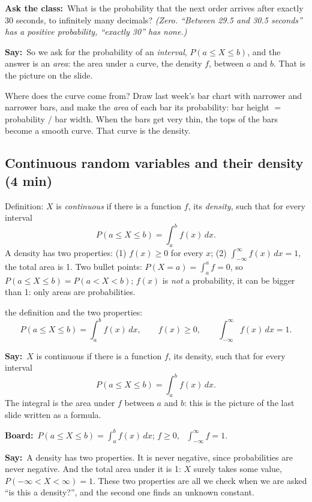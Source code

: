 \documentclass[11pt,a4paper,parskip=half]{scrartcl}
\renewcommand{\needspace}[1]{\Needspace{6\baselineskip}}
\newcommand{\say}{\textbf{\color{teal}Say:}\ }
\newcommand{\board}{\textbf{\color{gold}Board:}\ }
\newcommand{\ask}{\textbf{\color{navy}Ask the class:}\ }
\begin{document}
\ask What is the probability that the next order arrives after exactly
30 seconds, to infinitely many decimals? \emph{(Zero. ``Between 29.5 and
30.5 seconds'' has a positive probability, ``exactly 30'' has none.)}

\say So we ask for the probability of an \emph{interval},
$P(a\le X\le b)$, and the answer is an \emph{area}: the area under a curve,
the density $f$, between $a$ and $b$. That is the picture on the slide.

Where does the curve come from? Draw last week's bar chart with narrower
and narrower bars, and make the \emph{area} of each bar its probability:
bar height $=$ probability $/$ bar width. When the bars get very thin, the
tops of the bars become a smooth curve. That curve is the density.

\needspace{0.35\textheight}
\subsection{Continuous random variables and their density (4 min)}

\begin{onslide}
	Definition: $X$ is \emph{continuous} if there is a function $f$, its
	\emph{density}, such that for every interval
	\[ P(a\le X\le b)=\int_a^b f(x)\,dx. \]
	A density has two properties: (1) $f(x)\ge0$ for every $x$; (2)
	$\int_{-\infty}^{\infty}f(x)\,dx=1$, the total area is 1. Two bullet
	points: $P(X=a)=\int_a^a f=0$, so $P(a\le X\le b)=P(a<X<b)$; $f(x)$ is
	\emph{not} a probability, it can be bigger than 1: only areas are
	probabilities.
\end{onslide}

\begin{printeq}
\begin{slidefig}
	the definition and the two properties:
	\[ P(a\le X\le b)=\int_a^b f(x)\,dx,\qquad f(x)\ge0,\qquad
		\int_{-\infty}^{\infty}f(x)\,dx=1. \]
\end{slidefig}
\end{printeq}

\say $X$ is continuous if there is a function $f$, its density, such that
for every interval
\[ P(a\le X\le b)=\int_a^b f(x)\,dx. \]
The integral is the area under $f$ between $a$ and $b$: this is the
picture of the last slide written as a formula.

\board $P(a\le X\le b)=\int_a^b f(x)\,dx$; \quad $f\ge0$, \
$\int_{-\infty}^{\infty}f=1$.

\say A density has two properties. It is never negative, since
probabilities are never negative. And the total area under it is 1: $X$
surely takes some value, $P(-\infty<X<\infty)=1$. These two properties
are all we check when we are asked ``is this a density?'', and the second
one finds an unknown constant.
\end{document}
